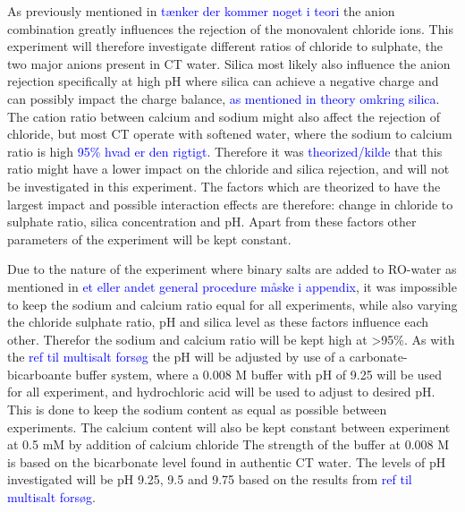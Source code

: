 As previously mentioned in \textcolor{blue}{tænker der kommer noget i teori} the anion combination greatly influences the rejection of the monovalent chloride ions. 
This experiment will therefore investigate different ratios of chloride to sulphate, the two major anions present in CT water. 
Silica most likely also influence the anion rejection specifically at high pH where silica can achieve a negative charge and can possibly impact the charge balance, \textcolor{blue}{as mentioned in theory omkring silica}.
The cation ratio between calcium and sodium might also affect the rejection of chloride, but most CT operate with softened water, where the sodium to calcium ratio is high \textcolor{blue}{95\% hvad er den rigtigt}. 
Therefore it was \textcolor{blue}{theorized/kilde} that this ratio might have a lower impact on the chloride and silica rejection, and will not be investigated in this experiment. 
The factors which are theorized to have the largest impact and possible interaction effects are therefore: change in chloride to sulphate ratio, silica concentration and pH. 
Apart from these factors other parameters of the experiment will be kept constant. 


Due to the nature of the experiment where binary salts are added to RO-water as mentioned in \textcolor{blue}{et eller andet general procedure måske i appendix}, it was impossible to keep the sodium and calcium ratio equal for all experiments, while also varying the chloride sulphate ratio, pH and silica level as these factors influence each other. Therefor the sodium and calcium ratio will be kept high at >95\%. 
As with the \textcolor{blue}{ref til multisalt forsøg} the pH will be adjusted by use of a carbonate-bicarboante buffer system, where a 0.008 M buffer with pH of 9.25 will be used for all experiment, and hydrochloric acid will be used to adjust to desired pH. This is done to keep the sodium content as equal as possible between experiments. 
The calcium content will also be kept constant between experiment at 0.5 mM by addition of calcium chloride 
The strength of the buffer at 0.008 M is based on the bicarbonate level found in authentic CT water.
The levels of pH investigated will be pH 9.25, 9.5 and 9.75 based on the results from  \textcolor{blue}{ref til multisalt forsøg}. 


